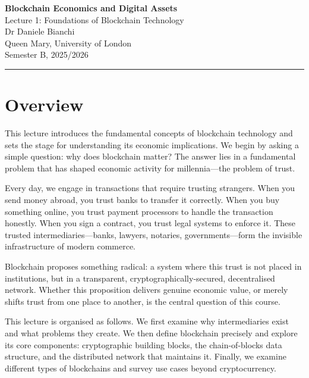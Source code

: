 \documentclass[11pt,a4paper]{article}
\begin{document}
\begin{center}
    {\LARGE\bfseries\textcolor{ImperialBlue}{Blockchain Economics and Digital Assets}}\\[0.5em]
    {\Large Lecture 1: Foundations of Blockchain Technology}\\[1em]
    {\large Dr Daniele Bianchi}\\[0.5em]
    {\normalsize Queen Mary, University of London}\\[0.3em]
    {\normalsize Semester B, 2025/2026}
\end{center}

\vspace{1em}
\hrule
\vspace{1em}

\tableofcontents

\vspace{2cm}

\section*{Overview}

This lecture introduces the fundamental concepts of blockchain technology and sets the stage for understanding its economic implications. We begin by asking a simple question: why does blockchain matter? The answer lies in a fundamental problem that has shaped economic activity for millennia---the problem of trust.

Every day, we engage in transactions that require trusting strangers. When you send money abroad, you trust banks to transfer it correctly. When you buy something online, you trust payment processors to handle the transaction honestly. When you sign a contract, you trust legal systems to enforce it. These trusted intermediaries---banks, lawyers, notaries, governments---form the invisible infrastructure of modern commerce.

Blockchain proposes something radical: a system where this trust is not placed in institutions, but in a transparent, cryptographically-secured, decentralised network. Whether this proposition delivers genuine economic value, or merely shifts trust from one place to another, is the central question of this course.

This lecture is organised as follows. We first examine why intermediaries exist and what problems they create. We then define blockchain precisely and explore its core components: cryptographic building blocks, the chain-of-blocks data structure, and the distributed network that maintains it. Finally, we examine different types of blockchains and survey use cases beyond cryptocurrency.
\end{document}
